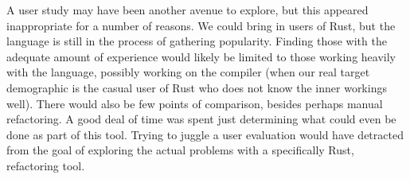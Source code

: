 A user study may have been another avenue to explore, but this appeared inappropriate for a number of reasons. We could bring in users of Rust, but the language is still in the process of gathering popularity. Finding those with the adequate amount of experience would likely be limited to those working heavily with the language, possibly working on the compiler (when our real target demographic is the casual user of Rust who does not know the inner workings well). There would also be few points of comparison, besides perhaps manual refactoring. A good deal of time was spent just determining what could even be done as part of this tool. Trying to juggle a user evaluation would have detracted from the goal of exploring the actual problems with a specifically Rust, refactoring tool. 
